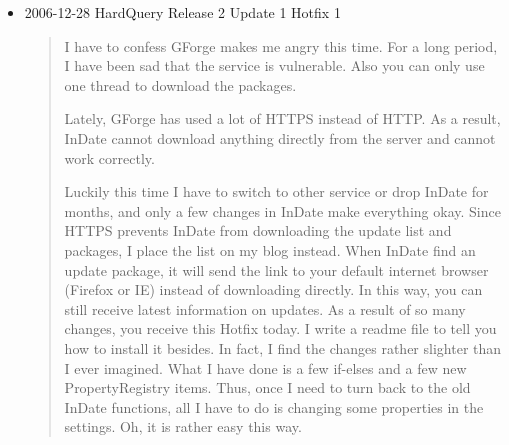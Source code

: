 \begin{itemize}
  \item 2006-12-28 HardQuery Release 2 Update 1 Hotfix 1
  \begin{quotation}
    I have to confess GForge makes me angry this time. For a long period, I have
    been sad that the service is vulnerable. Also you can only use one thread to
    download the packages.

    Lately, GForge has used a lot of HTTPS instead of HTTP. As a result, InDate
    cannot download anything directly from the server and cannot work correctly.

    Luckily this time I have to switch to other service or drop InDate for months,
    and only a few changes in InDate make everything okay. Since HTTPS prevents
    InDate from downloading the update list and packages, I place the list on my
    blog instead. When InDate find an update package, it will send the link to your
    default internet browser (Firefox or IE) instead of downloading directly. In
    this way, you can still receive latest information on updates. As a result of
    so many changes, you receive this Hotfix today. I write a readme file to tell
    you how to install it besides. In fact, I find the changes rather slighter than
    I ever imagined. What I have done is a few if-elses and a few new
    PropertyRegistry items. Thus, once I need to turn back to the old InDate
    functions, all I have to do is changing some properties in the settings. Oh, it
    is rather easy this way.
  \end{quotation}


\end{itemize}
